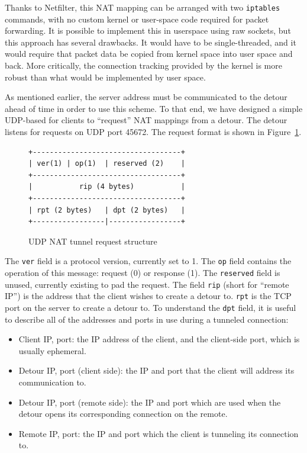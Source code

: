 \documentclass{cwru}
\begin{document}
Thanks to Netfilter, this NAT mapping can be arranged with two \texttt{iptables}
commands, with no custom kernel or user-space code required for packet
forwarding. It is possible to implement this in userspace using raw sockets, but
this approach has several drawbacks. It would have to be single-threaded, and it
would require that packet data be copied from kernel space into user space and
back. More critically, the connection tracking provided by the kernel is more
robust than what would be implemented by user space.

As mentioned earlier, the server address must be communicated to the detour
ahead of time in order to use this scheme. To that end, we have designed a
simple UDP-based for clients to ``request'' NAT mappings from a detour. The
detour listens for requests on UDP port 45672. The request format is shown
in Figure~\ref{fig:udp-nat-packet}.

\begin{figure}
  \centering
\begin{BVerbatim}
+-----------------------------------+
| ver(1) | op(1)  | reserved (2)    |
+-----------------------------------+
|           rip (4 bytes)           |
+-----------------------------------+
| rpt (2 bytes)   | dpt (2 bytes)   |
+-----------------|-----------------+
\end{BVerbatim}
  \caption{UDP NAT tunnel request structure}
  \label{fig:udp-nat-packet}
\end{figure}

The \texttt{ver} field is a protocol version, currently set to 1. The
\texttt{op} field contains the operation of this message: request (0) or
response (1). The \texttt{reserved} field is unused, currently existing to pad
the request. The field \texttt{rip} (short for ``remote IP'') is the address
that the client wishes to create a detour to. \texttt{rpt} is the TCP port on
the server to create a detour to. To understand the \texttt{dpt} field, it is
useful to describe all of the addresses and ports in use during a tunneled
connection:
\begin{itemize}
\item Client IP, port: the IP address of the client, and the client-side port,
  which is usually ephemeral.
\item Detour IP, port (client side): the IP and port that the client will
  address its communication to.
\item Detour IP, port (remote side): the IP and port which are used when the
  detour opens its corresponding connection on the remote.
\item Remote IP, port: the IP and port which the client is tunneling its
  connection to.
\end{itemize}
\end{document}
